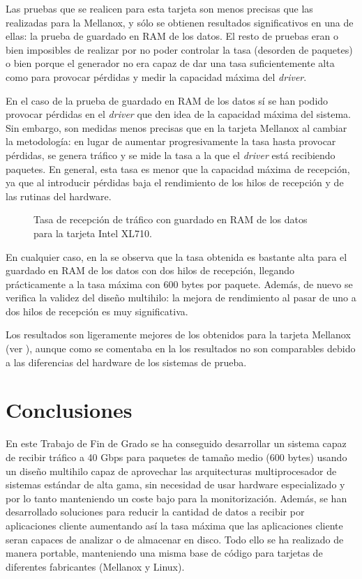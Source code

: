 \documentclass[twoside, 12pt]{epstfg}
\begin{document}
Las pruebas que se realicen para esta tarjeta son menos precisas que las realizadas para la Mellanox, y sólo se obtienen resultados significativos en una de ellas: la prueba de guardado en RAM de los datos. El resto de pruebas eran o bien imposibles de realizar por no poder controlar la tasa (desorden de paquetes) o bien porque el generador no era capaz de dar una tasa suficientemente alta como para provocar pérdidas y medir la capacidad máxima del \textit{driver}.

En el caso de la prueba de guardado en RAM de los datos sí se han podido provocar pérdidas en el \textit{driver} que den idea de la capacidad máxima del sistema. Sin embargo, son medidas menos precisas que en la tarjeta Mellanox al cambiar la metodología: en lugar de aumentar progresivamente la tasa hasta provocar pérdidas, se genera tráfico y se mide la tasa a la que el \textit{driver} está recibiendo paquetes. En general, esta tasa es menor que la capacidad máxima de recepción, ya que al introducir pérdidas baja el rendimiento de los hilos de recepción y de las rutinas del hardware.

\begin{figure}[hbtp]
\caption[Tasa de recepción para la tarjeta Intel XL710]{Tasa de recepción de tráfico con guardado en RAM de los datos para la tarjeta Intel XL710.}
\label{fig:Validacion:IntelHpcapdd}
\end{figure}

En cualquier caso, en la  se observa que la tasa obtenida es bastante alta para el guardado en RAM de los datos con dos hilos de recepción, llegando prácticamente a la tasa máxima con 600 bytes por paquete. Además, de nuevo se verifica la validez del diseño multihilo: la mejora de rendimiento al pasar de uno a dos hilos de recepción es muy significativa.

Los resultados son ligeramente mejores de los obtenidos para la tarjeta Mellanox (ver ), aunque como se comentaba en la  los resultados no son comparables debido a las diferencias del hardware de los sistemas de prueba.

\chapter{Conclusiones}
\label{chap:Conclusiones}

En este Trabajo de Fin de Grado se ha conseguido desarrollar un sistema capaz de recibir tráfico a 40 Gbps para paquetes de tamaño medio (600 bytes) usando un diseño multihilo capaz de aprovechar las arquitecturas multiprocesador de sistemas estándar de alta gama, sin necesidad de usar hardware especializado y por lo tanto manteniendo un coste bajo para la monitorización. Además, se han desarrollado soluciones para reducir la cantidad de datos a recibir por aplicaciones cliente aumentando así la tasa máxima que las aplicaciones cliente seran capaces de analizar o de almacenar en disco. Todo ello se ha realizado de manera portable, manteniendo una misma base de código para tarjetas de diferentes fabricantes (Mellanox y Linux).
\end{document}
